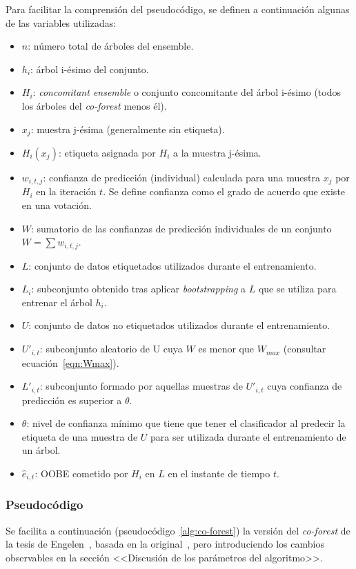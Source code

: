 Para facilitar la comprensión del pseudocódigo, se definen a continuación algunas de las variables utilizadas:
\begin{itemize}
	\item $n$: número total de árboles del ensemble.
	\item $h_{i}$: árbol i-ésimo del conjunto.
	\item $H_{i}$: \textit{concomitant ensemble} o conjunto concomitante del árbol i-ésimo (todos los árboles del \textit{co-forest} menos él).
	\item $x_j$: muestra j-ésima (generalmente sin etiqueta).
	\item $H_i(x_j)$: etiqueta asignada por $H_i$ a la muestra j-ésima.
	\item $w_{i,t,j}$: confianza de predicción (individual) calculada para una muestra $x_j$ por $H_{i}$ en la iteración $t$. Se define confianza como el grado de acuerdo que existe en una votación. 
	\item $W$: sumatorio de las confianzas de predicción individuales de un conjunto $W = \sum w_{i,t,j}$.
	\item $L$: conjunto de datos etiquetados utilizados durante el entrenamiento.
	\item $L_{i}$: subconjunto obtenido tras aplicar \textit{bootstrapping} a $L$ que se utiliza para entrenar el árbol $h_{i}$.
	\item $U$: conjunto de datos no etiquetados utilizados durante el entrenamiento.
	\item $U'_{i,t}$: subconjunto aleatorio de U cuya $W$ es menor que $W_{max}$ (consultar ecuación~\ref{eqn:Wmax}).
	\item $L'_{i,t}$: subconjunto formado por aquellas muestras de $U'_{i,t}$ cuya confianza de predicción es superior a $\theta$.
	\item $\theta$: nivel de confianza mínimo que tiene que tener el clasificador al predecir la etiqueta de una muestra de $U$ para ser utilizada durante el entrenamiento de un árbol.
	\item $\hat{e}_{i,t}$: OOBE cometido por $H_{i}$ en $L$ en el instante de tiempo $t$.
\end{itemize} 

\subsubsection{Pseudocódigo}

Se facilita a continuación (pseudocódigo~\ref{alg:co-forest}) la versión del \textit{co-forest} de la tesis de Engelen~\cite{engelen2018thesis}, basada en la original~\cite{originalCoForest2007}, pero introduciendo los cambios observables en la sección <<Discusión de los parámetros del algoritmo>>.

